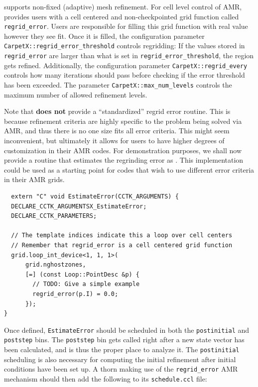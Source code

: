\CarpetX\space supports non-fixed (adaptive) mesh refinement. For cell level control of AMR, \CarpetXRegridError\space provides users with a cell centered and non-checkpointed grid function called \texttt{regrid\_error}. Users are responsible for filling this grid function with real value however they see fit. Once it is filled, the configuration parameter \texttt{CarpetX::regrid\_error\_threshold} controls regridding: If the values stored in \texttt{regrid\_error} are larger than what is set in \texttt{regrid\_error\_threshold}, the region gets refined. Additionally, the configuration parameter \texttt{CarpetX::regrid\_every} controls how many iterations should pass before checking if the error threshold has been exceeded. The parameter \texttt{CarpetX::max\_num\_levels} controls the maximum number of allowed refinement levels.

Note that \CarpetX\space \textbf{does not} provide a ``standardized'' regrid error routine. This is because refinement criteria are highly specific to the problem being solved via AMR, and thus there is no one size fits all error criteria. This might seem inconvenient, but ultimately it allows for users to have higher degrees of customization in their AMR codes. For demonstration purposes, we shall now provide a routine that estimates the regrinding error as . This implementation could be used as a starting point for codes that wish to use different error criteria in their AMR grids.

\begin{lstlisting}
  extern "C" void EstimateError(CCTK_ARGUMENTS) {
  DECLARE_CCTK_ARGUMENTSX_EstimateError;
  DECLARE_CCTK_PARAMETERS;

  // The template indices indicate this a loop over cell centers
  // Remember that regrid_error is a cell centered grid function
  grid.loop_int_device<1, 1, 1>(
      grid.nghostzones,
      [=] (const Loop::PointDesc &p) {
        // TODO: Give a simple example
        regrid_error(p.I) = 0.0;
      });
}
\end{lstlisting}

Once defined, \texttt{EstimateError} should be scheduled in both the \texttt{postinitial} and \texttt{poststep} bins. The \texttt{poststep} bin gets called right after a new state vector has been calculated, and is thus the proper place to analyze it. The \texttt{postinitial} scheduling is also necessary for computing the initial refinement after initial conditions have been set up. A thorn making use of the \texttt{regrid\_error} AMR mechanism should then add the following to its \texttt{schedule.ccl} file:

